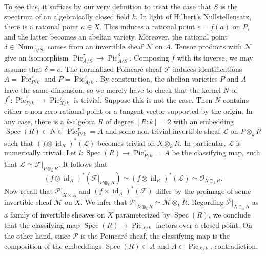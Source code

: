 \documentclass[oneside, 12pt]{amsart}
\theoremstyle{definition}
\theoremstyle{remark}
\newcommand{\shF}{\mathscr{F}}
\newcommand{\shM}{\mathscr{M}}
\newcommand{\shN}{\mathscr{N}}
\newcommand{\shL}{\mathscr{L}}
\newcommand{\shP}{\mathscr{P}}
\newcommand{\id}{{\operatorname{id}}}
\newcommand{\Num}{\operatorname{Num}}
\renewcommand{\O}{\mathscr{O}}
\newcommand{\Pic}{\operatorname{Pic}}
\newcommand{\ra}{\rightarrow}
\newcommand{\Spec}{\operatorname{Spec}}
\begin{document}
To see this, it suffices by our very definition
to treat the case that $S$ is the spectrum of an algebraically closed field $k$.
In light of Hilbert's Nullstellensatz, there is a rational point $a\in X$. This induces a rational point
$e=f(a)$ on $P$, and the latter becomes an abelian variety. 
Moreover, the rational point $\delta\in\Num_{A/S}$ comes from an invertible sheaf $\shN$ on $A$.
Tensor products with $\shN$ give  an isomorphism $\Pic^\tau_{A/S}\ra\Pic^\delta_{A/S}$.
Composing $f$ with its inverse, we may assume that $\delta =e$.
The normalized Poincar\'e sheaf $\shF$
induces   identifications $A=\Pic^\tau_{P/k}$ and $P=\Pic^\tau_{A/k}$.
By construction, the abelian varieties $P$ and $A$ have the same dimension, so we merely have to check that
the   kernel $N$ of  $f^*:\Pic^\tau_{P/k}\ra \Pic^\tau_{X/k}$ is trivial.
Suppose this is not the case. Then $N$   contains either a non-zero rational point 
or a tangent vector supported by the origin. In any case, there  is a $k$-algebra $R$ of degree $[R:k]=2$
with an embedding $\Spec(R)\subset N\subset \Pic^\tau_{P/k}=A$
and some non-trivial invertible sheaf $\shL$ on $P\otimes_kR$ such that $(f\otimes\id_R)^*(\shL)$ becomes
trivial on $X\otimes_kR$. In particular, $\shL$ is numerically trivial.
Let $l:\Spec(R)\ra \Pic^\tau_{P/k}=A$ be the classifying map, such that $\shL\simeq \shF|_{P\otimes_kR}$.
It follows that 
$$
(f\otimes\id_R)^*(\shF|_{P\otimes_kR})\simeq (f\otimes\id_R)^*(\shL)\simeq\O_{X\otimes_kR}.
$$
Now recall that $\shP|_{X\times A}$ and $(f\times\id_A)^*(\shF)$ differ by the preimage of some invertible sheaf $\shM$ on $X$.
We infer that $\shP|_{X\otimes_k  R}\simeq \shM\otimes_kR$.
Regarding $\shP|_{X\otimes_kR}$ as a family of invertible sheaves on $X$ parameterized by   $\Spec(R)$,
we conclude that the classifying map $\Spec(R)\ra \Pic_{X/k}$ factors over a closed point.
On the other hand, since $\shP$ is the Poincar\'e sheaf, the classifying map 
is the composition of the   embeddings $\Spec(R)\subset A$ and $A\subset\Pic_{X/k}$,
contradiction.
\end{document}
